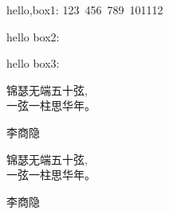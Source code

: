 \documentclass[11pt,a4paper]{article}
\begin{document}
hello,box1:
\mbox{123 456 789 101112}

hello box2:









hello box3:

\parbox[c]{90pt}{锦瑟无端五十弦,\\一弦一柱思华年。}李商隐

\begin{minipage}[c]{90pt}
锦瑟无端五十弦,\\一弦一柱思华年。
\end{minipage}李商隐
\end{document}
